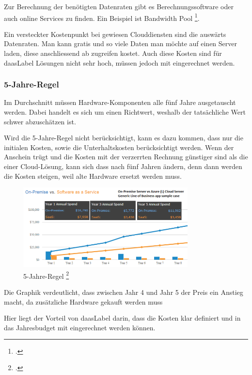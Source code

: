 Zur Berechnung der benötigten Datenraten gibt es Berechnungssoftware oder auch online Services zu finden. Ein Beispiel ist Bandwidth Pool \footcite{What_is_Bandwidth_Pool_Bandwidth_Pool_2014-12-22}.

Ein versteckter Kostenpunkt bei gewiesen Clouddiensten sind die auswärts Datenraten. Man kann gratis und so viele Daten man möchte auf einen Server laden, diese anschliessend ab zugreifen kostet.
Auch diese Kosten sind für \Gls{daasLabel} Lösungen nicht sehr hoch, müssen jedoch mit eingerechnet werden.

\subsubsection{5-Jahre-Regel}
Im Durchschnitt müssen Hardware-Komponenten alle fünf Jahre ausgetauscht werden. Dabei handelt es sich um einen Richtwert, weshalb der tatsächliche Wert schwer abzuschätzen ist.

Wird die 5-Jahre-Regel nicht berücksichtigt, kann es dazu kommen, dass nur die initialen Kosten, sowie die Unterhaltskosten berücksichtigt werden.
Wenn der Anschein trügt und die Kosten mit der verzerrten Rechnung günstiger sind als die einer Cloud-Lösung, kann sich dass nach fünf Jahren ändern, denn dann werden die Kosten steigen, weil alte Hardware ersetzt werden muss.

\begin{figure}[H]
	\includegraphics[width=0.8\textwidth]{images/five-year-rule}
	\caption{5-Jahre-Regel \footcite{Comparing_cloud_vs_on-premise_Six_hidden_costs_people_always_forget_about_2014-12-16}}
	\label{fig:fiveYearRuleImage}
\end{figure}
Die Graphik verdeutlicht, dass zwischen Jahr 4 und Jahr 5 der Preis ein Anstieg macht, da zusätzliche Hardware gekauft werden muss

Hier liegt der Vorteil von \Gls{daasLabel} darin, dass die Kosten klar definiert und in das Jahresbudget mit eingerechnet werden können.

